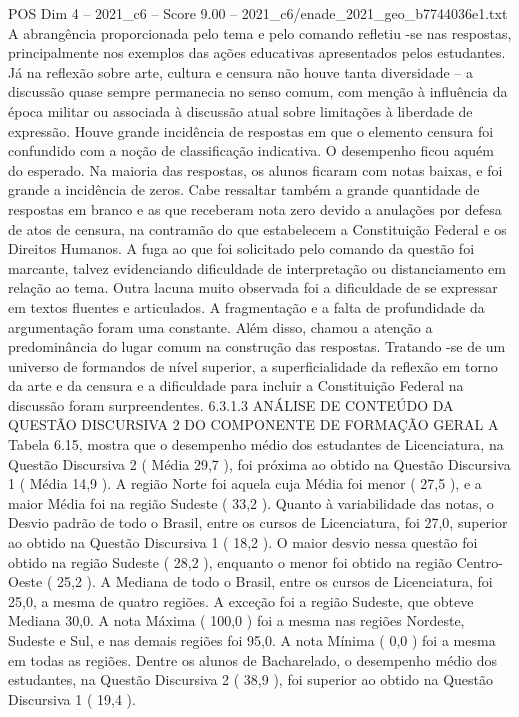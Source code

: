 \begin{textsample}{POS Dim 4 – 2021\_c6 – Score 9.00 – 2021\_c6/enade\_2021\_geo\_b7744036e1.txt}
A abrangência proporcionada pelo tema e pelo comando refletiu -se nas respostas, principalmente nos exemplos das ações educativas apresentados pelos estudantes.
Já na reflexão sobre arte, cultura e censura não houve tanta diversidade – a discussão quase sempre permanecia no senso comum, com menção à influência da época militar ou associada à discussão atual sobre limitações à liberdade de expressão.
Houve grande incidência de respostas em que o elemento censura foi confundido com a noção de classificação indicativa.
O desempenho ficou aquém do esperado.
Na maioria das respostas, os alunos ficaram com notas baixas, e foi grande a incidência de zeros.
Cabe ressaltar também a grande quantidade de respostas em branco e as que receberam nota zero devido a anulações por defesa de atos de censura, na contramão do que estabelecem a Constituição Federal e os Direitos Humanos.
A fuga ao que foi solicitado pelo comando da questão foi marcante, talvez evidenciando dificuldade de interpretação ou distanciamento em relação ao tema.
Outra lacuna muito observada foi a dificuldade de se expressar em textos fluentes e articulados.
A fragmentação e a falta de profundidade da argumentação foram uma constante.
Além disso, chamou a atenção a predominância do lugar comum na construção das respostas.
Tratando -se de um universo de formandos de nível superior, a superficialidade da reflexão em torno da arte e da censura e a dificuldade para incluir a Constituição Federal na discussão foram surpreendentes. 6.3.1.3 ANÁLISE DE CONTEÚDO DA QUESTÃO DISCURSIVA 2 DO COMPONENTE DE FORMAÇÃO GERAL A Tabela 6.15, mostra que o desempenho médio dos estudantes de Licenciatura, na Questão Discursiva 2 ( Média 29,7 ), foi próxima ao obtido na Questão Discursiva 1 ( Média 14,9 ).
A região Norte foi aquela cuja Média foi menor ( 27,5 ), e a maior Média foi na região Sudeste ( 33,2 ).
Quanto à variabilidade das notas, o Desvio padrão de todo o Brasil, entre os cursos de Licenciatura, foi 27,0, superior ao obtido na Questão Discursiva 1 ( 18,2 ).
O maior desvio nessa questão foi obtido na região Sudeste ( 28,2 ), enquanto o menor foi obtido na região Centro-Oeste ( 25,2 ).
A Mediana de todo o Brasil, entre os cursos de Licenciatura, foi 25,0, a mesma de quatro regiões.
A exceção foi a região Sudeste, que obteve Mediana 30,0.
A nota Máxima ( 100,0 ) foi a mesma nas regiões Nordeste, Sudeste e Sul, e nas demais regiões foi 95,0.
A nota Mínima ( 0,0 ) foi a mesma em todas as regiões.
Dentre os alunos de Bacharelado, o desempenho médio dos estudantes, na Questão Discursiva 2 ( 38,9 ), foi superior ao obtido na Questão Discursiva 1 ( 19,4 ).

\end{textsample}
